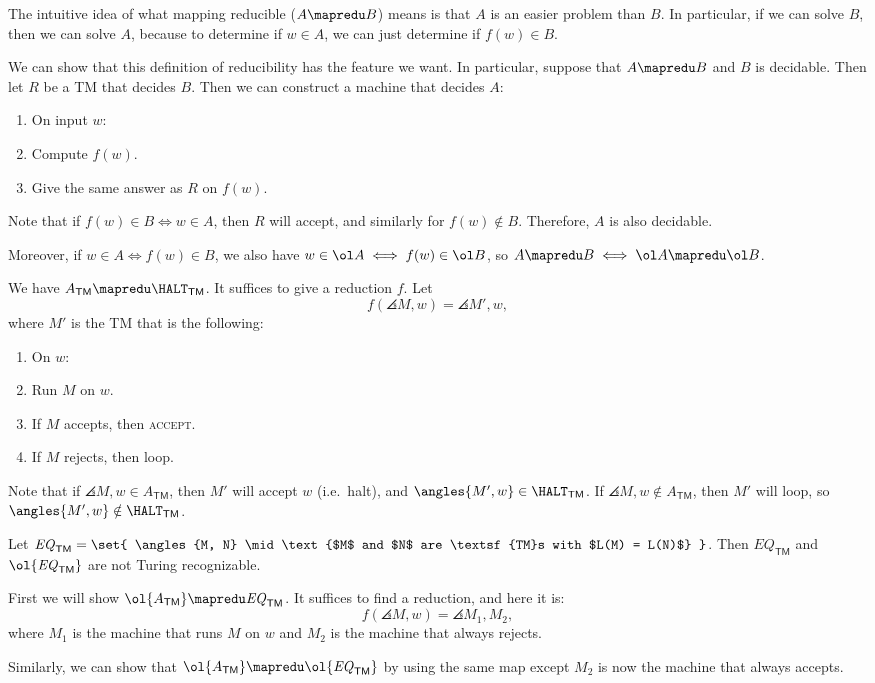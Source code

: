 \documentclass{standalone}
\begin{document}
The intuitive idea of what mapping reducible (\(A \mapredu B\)) means is that \(A\) is an easier problem than \(B\). In particular, if we can solve \(B\), then we can solve \(A\), because to determine if \(w \in A\), we can just determine if \(f(w) \in B\).

We can show that this definition of reducibility has the feature we want. In particular, suppose that \(A \mapredu B\) and \(B\) is decidable. Then let \(R\) be a \textsf{TM} that decides \(B\). Then we can construct a machine that decides \(A\):
\begin{enumerate}[start=0]
	\item On input \(w\):
	\item Compute \(f(w)\).
	\item Give the same answer as \(R\) on \(f(w)\).
\end{enumerate}
Note that if \(f(w) \in B \iff w \in A\), then \(R\) will accept, and similarly for \(f(w) \notin B\). Therefore, \(A\) is also decidable.

Moreover, if \(w \in A \iff f(w) \in B\), we also have \(w \in \ol A \iff f(w) \in \ol B\), so \(A \mapredu B \iff \ol A \mapredu \ol B\).


\begin{example}
	We have \(A_{\textsf{TM}} \mapredu \HALT_{\textsf{TM}}\).
	\tcblower
	It suffices to give a reduction \(f\). Let
	\[
		f(\angles{M, w}) = \angles{M', w},
	\]
	where \(M'\) is the \textsf{TM} that is the following:
	\begin{enumerate}[start=0]
		\item On \(w\):
		\item Run \(M\) on \(w\).
		\item If \(M\) accepts, then \textsc{accept}.
		\item If \(M\) rejects, then loop.
	\end{enumerate}

	Note that if \(\angles{M, w} \in A_{\textsf{TM}}\),
  then \(M'\) will accept \(w\) (i.e.\ halt),
  and \(\angles{M', w} \in \HALT_{\textsf{TM}}\).
  If \(\angles{M, w} \notin A_{\textsf{TM}}\),
  then \(M'\) will loop, so \(\angles{M', w} \notin \HALT_{\textsf{TM}}\).
\end{example}

\begin{example}
	Let \(\mathit{EQ}_{\textsf{TM}} = \set{
		\angles{M, N} \mid \text{$M$ and $N$ are \textsf{TM}s with $L(M) = L(N)$}
	}\). Then \(\mathit{EQ}_{\textsf{TM}}\) and \(\ol{\mathit{EQ}_{\textsf{TM}}}\) are not Turing recognizable.
	\tcblower
	
	First we will show \(\ol{A_{\textsf{TM}}} \mapredu \mathit{EQ}_{\textsf{TM}}\). It suffices to find a reduction, and here it is:
	\[
		f(\angles{M, w}) = \angles{M_1, M_2},
	\]
	where \(M_1\) is the machine that runs \(M\) on \(w\) and \(M_2\) is the machine that always rejects.

	Similarly, we can show that \(\ol{A_{\textsf{TM}}} \mapredu \ol{\mathit{EQ}_{\textsf{TM}}}\) by using the same map except \(M_2\) is now the machine that always accepts.
\end{example}
\end{document}
